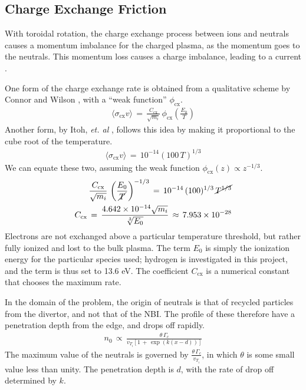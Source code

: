 \subsection{Charge Exchange Friction}\label{ssec:cx_friction}
With toroidal rotation, the charge exchange process between ions and neutrals causes a momentum imbalance for the charged plasma, as the momentum goes to the neutrals.
This momentum loss causes a charge imbalance, leading to a current \cite{toda_theoretical_1997}.

One form of the charge exchange rate is obtained from a qualitative scheme by Connor and Wilson \cite{connor_review_2000}, with a ``weak function'' $\phi_\text{cx}$.
\begin{align} %
	\langle \sigma_\text{cx} v\rangle \,=\, \frac{C_\text{cx}}{\sqrt{m_i}} \,
		\phi_\text{cx}\left(\frac{E_0}{T}\right) \label{eq:connor_cx_rate}
\end{align}
Another form, by Itoh, \emph{et. al} \cite{itoh_model_1989}, follows this idea by making it proportional to the cube root of the temperature.
\begin{align} %
	\langle \sigma_\text{cx} v\rangle \,=\, 10^{-14}
		\left(100 \, T\right)^{1/3} \label{eq:itoh_cx_rate}
\end{align}
We can equate these two, assuming the weak function $\phi_\text{cx}(z) \propto z^{-1/3}$.
\begin{align}
	\frac{C_\text{cx}}{\sqrt{m_i}} \, \left(\frac{E_0}{\cancel{T}}\right)^{-1/3}
		\,=\, 10^{-14} \, (100)^{1/3} \, \cancel{T^{1/3}} \\
	C_\text{cx} \,=\, \frac{4.642\times 10^{-14} \sqrt{m_i}}{\sqrt[3]{E_0}}
		\,\approx\, 7.953\times 10^{-28}
\end{align}
Electrons are not exchanged above a particular temperature threshold, but rather fully ionized and lost to the bulk plasma.
The term $E_0$ is simply the ionization energy for the particular species used; hydrogen is investigated in this project, and the term is thus set to 13.6 eV.
The coefficient $C_\text{cx}$ is a numerical constant that chooses the maximum rate.

In the domain of the problem, the origin of neutrals is that of recycled particles from the divertor, and not that of the NBI.
The profile of these therefore have a penetration depth from the edge, and drops off rapidly.
\begin{align} %
	n_0 \,\propto\, \frac{\theta\,\Gamma_c}{v_{T_i}\left[1 \,+\,
	\exp{(k(x - d))}\right]} \label{eq:neutral_density}
\end{align}
The maximum value of the neutrals is governed by $\frac{\theta\,\Gamma_c}{v_{T_i}}$, in which $\theta$ is some small value less than unity.
The penetration depth is $d$, with the rate of drop off determined by $k$.

